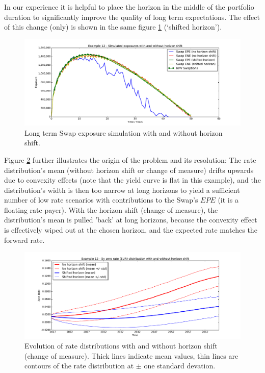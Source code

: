 \documentclass[12pt, a4paper]{article}
\newcommand{\EPE}{\mathit{EPE}}
\begin{document}
{In our experience it is helpful to place the horizon in the middle of the portfolio duration to significantly improve
the quality of long term expectations. The effect of this change (only) is shown in the same figure \ref{fig_15}
(`shifted horizon').
\begin{figure}[h!]
\begin{center}
\includegraphics[scale=0.45]{mpl_longterm.pdf}
\end{center}
\caption{Long term Swap exposure simulation with and without horizon shift.}
\label{fig_15}
\end{figure}
Figure \ref{fig_15b} further illustrates the origin of the problem and its resolution: The rate distribution's mean
(without horizon shift or change of measure) drifts upwards due to convexity effects (note that the yield curve is flat
in this example), and the distribution's width is then too narrow at long horizons to yield a sufficient number of low
rate scenarios with contributions to the Swap's $\EPE$ (it is a floating rate payer). With the horizon shift (change of
measure), the distribution's mean is pulled 'back' at long horizons, because the convexity effect is effectively wiped
out at the chosen horizon, and the expected rate matches the forward rate.

\begin{figure}[h!]
\begin{center}
\includegraphics[scale=0.45]{mpl_rates.pdf}
\end{center}
\caption{Evolution of rate distributions with and without horizon shift (change of measure). Thick lines indicate mean
  values, thin lines are contours of the rate distribution at $\pm$ one standard devation.}
\label{fig_15b}
\end{figure}

}
\end{document}
